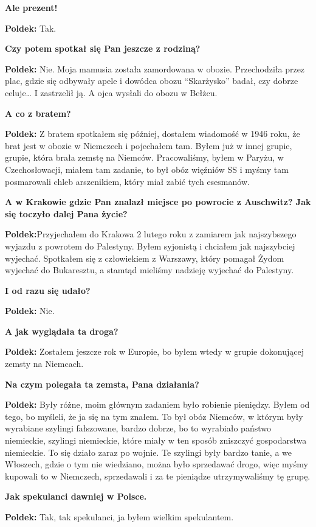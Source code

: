 \begin{otherlanguage}{polish}
\textbf{Ale prezent!}
 
\textbf{Poldek:} Tak.
   
\textbf{Czy potem spotkał się Pan jeszcze z rodziną?}

\textbf{Poldek:} Nie. Moja mamusia została zamordowana w obozie. Przechodziła przez plac, gdzie się odbywały apele i dowódca obozu "`Skarżysko"' badał, czy dobrze celuje… I zastrzelił ją. A ojca wysłali do obozu w Bełżcu.

\textbf{A co z bratem?}

\textbf{Poldek:}  Z bratem spotkałem się później, dostałem wiadomość w 1946 roku, że brat jest w obozie w Niemczech i pojechałem tam. Byłem już w innej grupie, grupie, która brała zemstę na Niemców. Pracowaliśmy, byłem w Paryżu, w Czechosłowacji, miałem tam zadanie, to był obóz więźniów SS i myśmy tam posmarowali chleb arszenikiem, który miał zabić tych esesmanów.

\textbf{A w Krakowie gdzie Pan znalazł miejsce po powrocie z Auschwitz? Jak się toczyło dalej Pana życie?}

\textbf{Poldek:}Przyjechałem do Krakowa 2 lutego roku z zamiarem jak najszybszego wyjazdu z powrotem do Palestyny. Byłem syjonistą i chciałem jak najszybciej wyjechać. Spotkałem się z człowiekiem z Warszawy, który pomagał Żydom wyjechać do Bukaresztu, a stamtąd mieliśmy nadzieję wyjechać do Palestyny.

\textbf{I od razu się udało?}

\textbf{Poldek:} Nie.
 
\textbf{A jak wyglądała ta droga?}

\textbf{Poldek:} Zostałem jeszcze rok w Europie, bo byłem wtedy w grupie dokonującej zemsty na Niemcach.

\textbf{Na czym polegała ta zemsta, Pana działania?}
 
\textbf{Poldek:} Były różne, moim głównym zadaniem było robienie pieniędzy. Byłem od tego, bo myśleli, że ja się na tym znałem. To był obóz Niemców, w którym były wyrabiane szylingi fałszowane, bardzo dobrze, bo to wyrabiało państwo niemieckie, szylingi niemieckie, które miały w ten sposób zniszczyć gospodarstwa niemieckie. To się działo zaraz po wojnie. Te szylingi były bardzo tanie, a we Włoszech, gdzie o tym nie wiedziano, można było sprzedawać drogo, więc myśmy kupowali to w Niemczech, sprzedawali i za te pieniądze utrzymywaliśmy tę grupę.
 
\textbf{Jak spekulanci dawniej w Polsce.}
  
\textbf{Poldek:} Tak, tak spekulanci, ja byłem wielkim spekulantem.
  

\end{otherlanguage}
